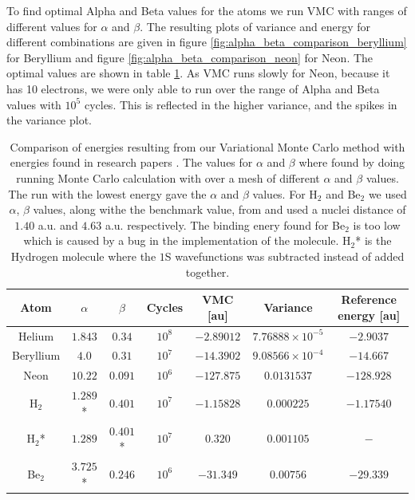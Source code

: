		To find optimal Alpha and Beta values for the atoms we run VMC with ranges of different values for \(\alpha\) and \(\beta\). The resulting plots of variance and energy for different combinations are given in figure \ref{fig:alpha_beta_comparison_beryllium} for Beryllium and figure \ref{fig:alpha_beta_comparison_neon} for Neon. The optimal values are shown in table \ref{tab:EnergyAlphaBetaReference}. As VMC runs slowly for Neon, because it has 10 electrons, we were only able to run over the range of Alpha and Beta values with $10^{5}$ cycles. This is reflected in the higher variance, and the spikes in the variance plot.

		\begin{table}
			\center %
			\begin{tabular}{|c|c|c|c|c|c|c|}
				\hline 
				Atom  & $\alpha$ & $\beta$ & Cycles & VMC {[}au{]} & Variance & Reference energy {[}au{]} \tabularnewline
				\hline 
				Helium & $1.843$ & $0.34$ & $10^{8}$ & $-2.89012$ & $7.76888\times10^{-5}$ & $-2.9037$\tabularnewline
				\hline 
				Beryllium  & $4.0$ & $0.31$ & $10^{7}$ & $-14.3902$  & $9.08566\times10^{-4}$ & $-14.667$ \tabularnewline
				\hline 
				Neon  & $10.22$ & $0.091$ & $10^{6}$ & $-127.875$ & $0.0131537$ & $-128.928$ \tabularnewline
				\hline 
				H$_2$ & $1.289$* & $0.401$ & $10^7$ & $-1.15828$	& $0.000225$  & $-1.17540$ \tabularnewline
				\hline 
				H$_2$*  & $1.289$ & $0.401$* & $10^7$ & $0.320$	& $0.001105$  & $-$ \tabularnewline
				\hline
				Be$_{2}$ & $3.725$* & $0.246$ & $10^6$ & $ -31.349 $	& $ 0.00756 $  & $-29.339$ \tabularnewline
				\hline
			\end{tabular}\protect\caption{Comparison of energies resulting from our Variational Monte Carlo method with
			energies found in research papers \parencite{Koput_2011_PCCP} \parencite{Binkley_1975}. The values for \(\alpha\) and \( \beta \) where found by doing running Monte Carlo calculation with over a mesh of different \(\alpha\) and \( \beta \) values. The run with the lowest energy gave the \(\alpha\) and \(\beta\) values. For H$_2$ and Be$_2$ we used $\alpha$, $\beta$ values, along withe the benchmark value, from \citet{Ihle_Ledum} and used a nuclei distance of \( 1.40 \) a.u. and \( 4.63\) a.u. respectively. The binding enery found for Be\(_2\) is too low which is caused by a bug in the implementation of the molecule. H$_2$* is the Hydrogen molecule where the \(1\)S wavefunctions was subtracted instead of added together.}
			\label{tab:EnergyAlphaBetaReference} 
		\end{table}


